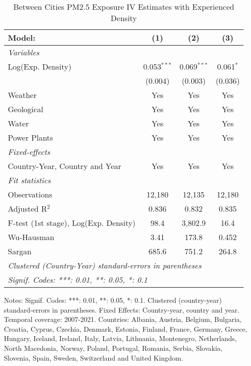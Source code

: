 
\begin{table}[htbp]
   \caption{\label{tab:iv_bet_expden} Between Cities PM2.5 Exposure IV Estimates with Experienced Density}
   \centering
   \small
   \begin{tabular}{lccc}
      \tabularnewline \midrule \midrule
      Model:                                & (1)           & (2)           & (3)\\  
      \midrule
      \emph{Variables}\\
      Log(Exp. Density)                     & 0.053$^{***}$ & 0.069$^{***}$ & 0.061$^{*}$\\   
                                            & (0.004)       & (0.003)       & (0.036)\\   
      Weather                               & Yes           & Yes           & Yes\\  
      Geological                            & Yes           & Yes           & Yes\\  
      Water                                 & Yes           & Yes           & Yes\\  
      Power Plants                          & Yes           & Yes           & Yes\\  
      \midrule
      \emph{Fixed-effects}\\
      Country-Year, Country and Year        & Yes           & Yes           & Yes\\  
      \midrule
      \emph{Fit statistics}\\
      Observations                          & 12,180        & 12,135        & 12,180\\  
      Adjusted R$^2$                        & 0.836         & 0.832         & 0.835\\  
      F-test (1st stage), Log(Exp. Density) & 98.4          & 3,802.9       & 16.4\\  
      Wu-Hausman                            & 3.41          & 173.8         & 0.452\\  
      Sargan                                & 685.6         & 751.2         & 264.8\\  
      \midrule \midrule
      \multicolumn{4}{l}{\emph{Clustered (Country-Year) standard-errors in parentheses}}\\
      \multicolumn{4}{l}{\emph{Signif. Codes: ***: 0.01, **: 0.05, *: 0.1}}\\
   \end{tabular}
   
   \par \raggedright 
   Notes: Signif. Codes: ***: 0.01, **: 0.05, *: 0.1. Clustered (country-year) standard-errors in parentheses. Fixed Effects: Country-year, country and year. Temporal coverage: 2007-2021. Countries: Albania, Austria, Belgium, Bulgaria, Croatia, Cyprus, Czechia, Denmark, Estonia, Finland, France, Germany, Greece, Hungary, Iceland, Ireland, Italy, Latvia, Lithuania, Montenegro, Netherlands, North Macedonia, Norway, Poland, Portugal, Romania, Serbia, Slovakia, Slovenia, Spain, Sweden, Switzerland and United Kingdom.
\end{table}


